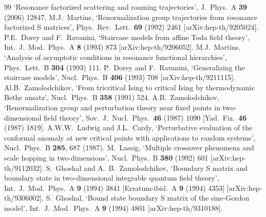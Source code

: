 \documentclass[11pt]{article}
\begin{document}
\begin{thebibliography}{99}
  `Resonance factorized scattering and roaming trajectories',
  J.\ Phys.\ A  {\bf 39} (2006) 12847.
%
  M.J.~Martins,
  `Renormalization group trajectories from resonance factorized S
  matrices',
  Phys.\ Rev.\ Lett.\  {\bf 69} (1992) 2461
  [arXiv:hep-th/9205024].
%
  P.E.~Dorey and F.~Ravanini,
  `Staircase models from affine Toda field theory',
  Int.\ J.\ Mod.\ Phys.\  A {\bf 8} (1993) 873
  [arXiv:hep-th/9206052].
%
  M.J.~Martins,
  `Analysis of asymptotic conditions in resonance functional
  hierarchies',
  Phys.\ Lett.\  B {\bf 304} (1993) 111.
%
  P.~Dorey and F.~Ravanini,
  `Generalizing the staircase models',
  Nucl.\ Phys.\  B {\bf 406} (1993) 708
  [arXiv:hep-th/9211115].
%
  Al.B.~Zamolodchikov,
  `From tricritical Ising to critical Ising by thermodynamic Bethe
  ansatz',
  Nucl.\ Phys.\  B {\bf 358} (1991) 524.
%
  A.B.~Zamolodchikov,
  `Renormalization group and perturbation theory near fixed points
  in two-dimensional field theory',
  Sov.\ J.\ Nucl.\ Phys.\  {\bf 46} (1987) 1090
  [Yad.\ Fiz.\  {\bf 46} (1987) 1819].
%
  A.W.W.~Ludwig and J.L.~Cardy,
  `Perturbative evaluation of the conformal anomaly at new critical
  points with applications to random systems',
  Nucl.\ Phys.\  B {\bf 285}, 687 (1987).
%
  M.~Lassig,
  `Multiple crossover phenomena and scale hopping in
  two-dimensions',
  Nucl.\ Phys.\  B {\bf 380} (1992) 601
  [arXiv:hep-th/9112032].
%
  S.~Ghoshal and A.~B.~Zamolodchikov,
  `Boundary S matrix and boundary state in two-dimensional
  integrable quantum field theory',
  Int.\ J.\ Mod.\ Phys.\  A {\bf 9} (1994) 3841
  [Erratum-ibid.\  A {\bf 9} (1994) 4353]
  [arXiv:hep-th/9306002].
%
  S.~Ghoshal,
  `Bound state boundary S matrix of the sine-Gordon model',
  Int.\ J.\ Mod.\ Phys.\  A {\bf 9} (1994) 4801
  [arXiv:hep-th/9310188].

\end{thebibliography}
\end{document}
